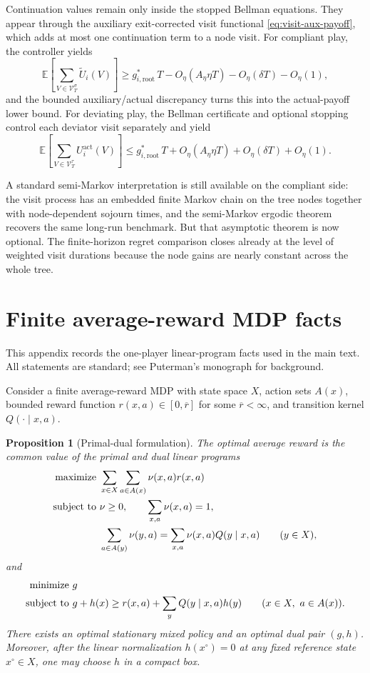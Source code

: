\documentclass[12pt]{article}
\newtheorem{proposition}[theorem]{Proposition}
\theoremstyle{definition}
\newcommand{\E}{\mathbb{E}}
\newcommand{\1}{\mathbf{1}}
\begin{document}
Continuation values remain only inside the stopped Bellman equations. They
appear through the auxiliary exit-corrected visit functional
\eqref{eq:visit-aux-payoff}, which adds at most one continuation term to a node
visit. For compliant play, the controller yields
\[
\E\left[\sum_{V\in\mathcal V_T^\sigma}\widetilde U_i(V)\right]
\ge
g_{i,\mathrm{root}}^*\,T-O_\eta(A_\eta\eta T)-O_\eta(\delta T)-O_\eta(1),
\]
and the bounded auxiliary/actual discrepancy turns this into the actual-payoff
lower bound. For deviating play, the Bellman certificate and optional stopping
control each deviator visit separately and yield
\[
\E\left[\sum_{V\in\mathcal V_T^\tau}U_i^{\mathrm{act}}(V)\right]
\le
g_{i,\mathrm{root}}^*\,T+O_\eta(A_\eta\eta T)+O_\eta(\delta T)+O_\eta(1).
\]

A standard semi-Markov interpretation is still available on the compliant side:
the visit process has an embedded finite Markov chain on the tree nodes together
with node-dependent sojourn times, and the semi-Markov ergodic theorem recovers
the same long-run benchmark. But that asymptotic theorem is now optional. The
finite-horizon regret comparison closes already at the level of weighted visit
durations because the node gains are nearly constant across the whole tree.

\appendix



\section{Finite average-reward MDP facts}
\label{app:mdp}

This appendix records the one-player linear-program facts used in the main text.
All statements are standard; see Puterman's monograph \cite{Puterman1994} for
background.

Consider a finite average-reward MDP with state space $X$, action sets $A(x)$,
bounded reward function $r(x,a)\in[0,\overline r]$ for some $\overline r<\infty$,
and transition kernel $Q(\cdot\mid x,a)$.

\begin{proposition}[Primal-dual formulation]
\label{prop:mdp-duality}
The optimal average reward is the common value of the primal and dual linear
programs
\begin{align*}
\textnormal{maximize }&\sum_{x\in X}\sum_{a\in A(x)}\nu(x,a)r(x,a)
\\
\textnormal{subject to }&\nu\ge 0,
\qquad \sum_{x,a}\nu(x,a)=1,
\\
&\sum_{a\in A(y)}\nu(y,a)=\sum_{x,a}\nu(x,a)Q(y\mid x,a)
\qquad (y\in X),
\end{align*}
and
\begin{align*}
\textnormal{minimize }&g
\\
\textnormal{subject to }&g+h(x)\ge r(x,a)+\sum_y Q(y\mid x,a)h(y)
\qquad (x\in X,\ a\in A(x)).
\end{align*}
There exists an optimal stationary mixed policy and an optimal dual pair $(g,h)$.
Moreover, after the linear normalization $h(x^\circ)=0$ at any fixed reference
state $x^\circ\in X$, one may choose $h$ in a compact box.
\end{proposition}
\end{document}
